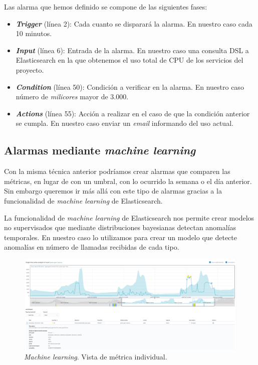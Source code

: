 Las alarma que hemos definido se compone de las siguientes fases: 
\begin{itemize}
\item \textit{\textbf{Trigger}} (línea 2): Cada cuanto se disparará la alarma. En nuestro caso cada 10 minutos.
\item \textit{\textbf{Input}} (línea 6): Entrada de la alarma. En nuestro caso una consulta DSL a Elasticsearch en la que obtenemos el uso total de CPU de los servicios del proyecto. 
\item \textit{\textbf{Condition}} (línea 50): Condición a verificar en la alarma. En nuestro caso número de \textit{milicores} mayor de 3.000.

\item \textit{\textbf{Actions}} (línea 55): Acción a realizar en el caso de que  la condición anterior se cumpla. En nuestro caso enviar un \textit{email} informando del uso actual.


\end{itemize}



\subsection{Alarmas mediante \textit{machine learning}}
Con la misma técnica anterior podríamos crear alarmas que comparen las métricas, en lugar de con un umbral, con lo ocurrido la semana o el día anterior. Sin embargo queremos ir más allá con este tipo de alarmas gracias a la funcionalidad de \textit{machine learning} de Elasticsearch. 

La funcionalidad de \textit{machine learning} de Elasticsearch nos permite crear modelos no supervisados que mediante distribuciones bayesianas detectan anomalías temporales. En nuestro caso lo utilizamos para crear un modelo que detecte anomalías en número de llamadas recibidas de cada tipo.  



\begin{figure}[!ht]
	\centering
	\includegraphics[width=1\textwidth]{images/serv/ml-factura}
	\caption{\textit{Machine learning}. Vista de métrica individual.}
	\label{fig:mlfactura}
\end{figure}

